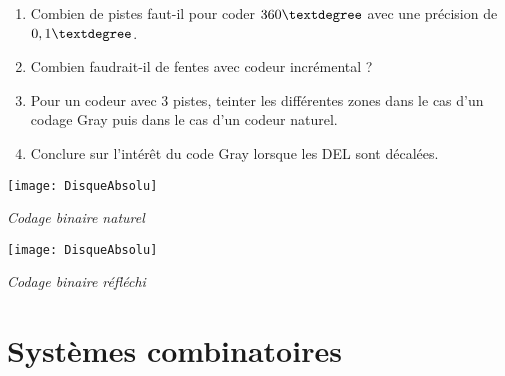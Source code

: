 \begin{exemple}
\begin{enumerate}
\item Combien de pistes faut-il pour coder $360 \textdegree$ avec une précision de $0,1 \textdegree$. 
\item Combien faudrait-il de fentes avec codeur incrémental ? 
\item Pour un codeur avec 3 pistes, teinter les différentes zones dans le cas d'un codage Gray puis dans le cas d'un codeur naturel.
\item Conclure sur l'intérêt du code Gray lorsque les DEL sont décalées. 
\end{enumerate}

\begin{minipage}[c]{.45\linewidth}
\begin{center}
\texttt{[image: DisqueAbsolu]}

\textit{Codage binaire naturel}
\end{center}
\end{minipage} \hfill
\begin{minipage}[c]{.45\linewidth}
\begin{center}
\texttt{[image: DisqueAbsolu]}

\textit{Codage binaire réfléchi}
\end{center}
\end{minipage}


\end{exemple}

\section{Systèmes combinatoires}
%
%
%
%


